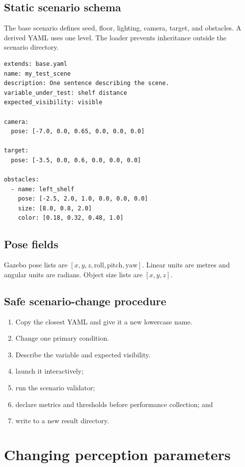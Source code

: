 \documentclass[11pt,oneside,openany]{book}
\newcommand{\file}[1]{\path{#1}}
\begin{document}
\section{Static scenario schema}

The base scenario defines seed, floor, lighting, camera, target, and obstacles. A derived YAML uses one \file{extends: base.yaml} level. The loader prevents inheritance outside the scenario directory.

\begin{lstlisting}
extends: base.yaml
name: my_test_scene
description: One sentence describing the scene.
variable_under_test: shelf distance
expected_visibility: visible

camera:
  pose: [-7.0, 0.0, 0.65, 0.0, 0.0, 0.0]

target:
  pose: [-3.5, 0.0, 0.6, 0.0, 0.0, 0.0]

obstacles:
  - name: left_shelf
    pose: [-2.5, 2.0, 1.0, 0.0, 0.0, 0.0]
    size: [8.0, 0.8, 2.0]
    color: [0.18, 0.32, 0.48, 1.0]
\end{lstlisting}

\section{Pose fields}

Gazebo pose lists are $[x,y,z,\mathrm{roll},\mathrm{pitch},\mathrm{yaw}]$. Linear units are metres and angular units are radians. Object size lists are $[x,y,z]$.

\section{Safe scenario-change procedure}

\begin{enumerate}
  \item Copy the closest YAML and give it a new lowercase name.
  \item Change one primary condition.
  \item Describe the variable and expected visibility.
  \item launch it interactively;
  \item run the scenario validator;
  \item declare metrics and thresholds before performance collection; and
  \item write to a new result directory.
\end{enumerate}

\chapter{Changing perception parameters}
\end{document}

